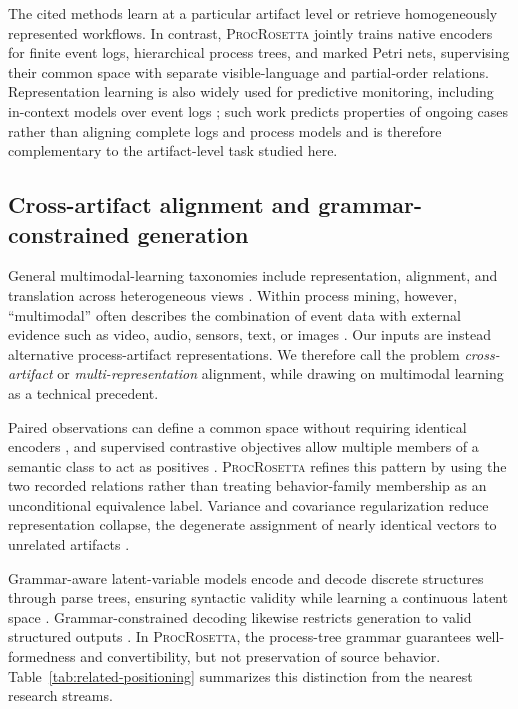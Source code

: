 \documentclass[pdflatex,sn-basic]{sn-jnl}
\newcommand{\model}{\textsc{ProcRosetta}\xspace}
\begin{document}
The cited methods learn at a particular artifact level or retrieve homogeneously represented workflows. In contrast, \model jointly trains native encoders for finite event logs, hierarchical process trees, and marked Petri nets, supervising their common space with separate visible-language and partial-order relations. Representation learning is also widely used for predictive monitoring, including in-context models over event logs \citep{Berti2026ICFM}; such work predicts properties of ongoing cases rather than aligning complete logs and process models and is therefore complementary to the artifact-level task studied here.

\subsection{Cross-artifact alignment and grammar-constrained generation}

General multimodal-learning taxonomies include representation, alignment, and translation across heterogeneous views \citep{Baltrusaitis2019Multimodal}. Within process mining, however, ``multimodal'' often describes the combination of event data with external evidence such as video, audio, sensors, text, or images \citep{Gavric2025MultimodalEvidence,Pasquadibisceglie2026MultimodalPPM}. Our inputs are instead alternative process-artifact representations. We therefore call the problem \emph{cross-artifact} or \emph{multi-representation} alignment, while drawing on multimodal learning as a technical precedent.

Paired observations can define a common space without requiring identical encoders \citep{Radford2021}, and supervised contrastive objectives allow multiple members of a semantic class to act as positives \citep{Khosla2020}. \model refines this pattern by using the two recorded relations rather than treating behavior-family membership as an unconditional equivalence label. Variance and covariance regularization reduce representation collapse, the degenerate assignment of nearly identical vectors to unrelated artifacts \citep{Bardes2022}.

Grammar-aware latent-variable models encode and decode discrete structures through parse trees, ensuring syntactic validity while learning a continuous latent space \citep{Kusner2017GrammarVAE}. Grammar-constrained decoding likewise restricts generation to valid structured outputs \citep{Geng2023}. In \model, the process-tree grammar guarantees well-formedness and convertibility, but not preservation of source behavior. Table~\ref{tab:related-positioning} summarizes this distinction from the nearest research streams.
\end{document}
